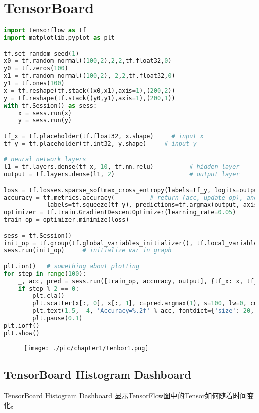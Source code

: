 \section{TensorBoard}
\begin{lstlisting}[language=Python]
import tensorflow as tf
import matplotlib.pyplot as plt

tf.set_random_seed(1)
x0 = tf.random_normal((100,2),2,2,tf.float32,0)
y0 = tf.zeros(100)
x1 = tf.random_normal((100,2),-2,2,tf.float32,0)
y1 = tf.ones(100)
x = tf.reshape(tf.stack((x0,x1),axis=1),(200,2))
y = tf.reshape(tf.stack((y0,y1),axis=1),(200,1))
with tf.Session() as sess:
    x = sess.run(x)
    y = sess.run(y)

tf_x = tf.placeholder(tf.float32, x.shape)     # input x
tf_y = tf.placeholder(tf.int32, y.shape)     # input y

# neural network layers
l1 = tf.layers.dense(tf_x, 10, tf.nn.relu)          # hidden layer
output = tf.layers.dense(l1, 2)                     # output layer

loss = tf.losses.sparse_softmax_cross_entropy(labels=tf_y, logits=output)           # compute cost
accuracy = tf.metrics.accuracy(          # return (acc, update_op), and create 2 local variables
            labels=tf.squeeze(tf_y), predictions=tf.argmax(output, axis=1),)[1]
optimizer = tf.train.GradientDescentOptimizer(learning_rate=0.05)
train_op = optimizer.minimize(loss)

sess = tf.Session()                                                                 # control training and others
init_op = tf.group(tf.global_variables_initializer(), tf.local_variables_initializer())
sess.run(init_op)     # initialize var in graph

plt.ion()   # something about plotting
for step in range(100):
    _, acc, pred = sess.run([train_op, accuracy, output], {tf_x: x, tf_y: y})
    if step % 2 == 0:
        plt.cla()
        plt.scatter(x[:, 0], x[:, 1], c=pred.argmax(1), s=100, lw=0, cmap='RdYlGn')
        plt.text(1.5, -4, 'Accuracy=%.2f' % acc, fontdict={'size': 20, 'color': 'red'})
        plt.pause(0.1)
plt.ioff()
plt.show()
\end{lstlisting}
\begin{figure}[H]
	\texttt{[image: ./pic/chapter1/tenbor1.png]}
\end{figure}
\subsection{TensorBoard Histogram Dashboard}
TensorBoard Histogram Dashboard 显示TensorFlow图中的Tensor如何随着时间变化。
